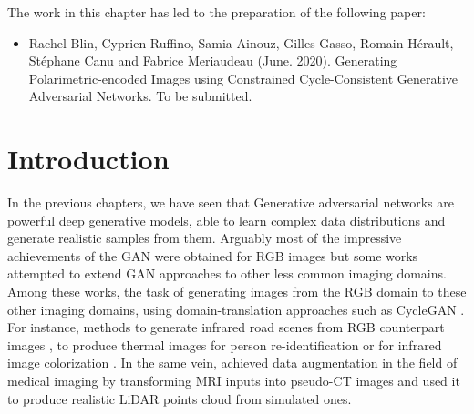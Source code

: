 The work in this chapter has led to the preparation of the following paper: 
\begin{itemize}
	\item Rachel Blin, Cyprien Ruffino, Samia Ainouz,  Gilles Gasso, Romain H\'erault, St\'ephane Canu and Fabrice Meriaudeau (June. 2020). Generating Polarimetric-encoded Images using Constrained Cycle-Consistent Generative Adversarial Networks.
	To be submitted.
\end{itemize}

\setcounter{minitocdepth}{3}
\minitoc
\setcounter{minitocdepth}{2}

\section{Introduction}


In the previous chapters, we have seen that Generative  adversarial networks \citep{Goodfellow2014} are powerful deep generative models, able to learn complex data distributions and generate realistic samples from them. Arguably most of the impressive achievements of the \ac{GAN} were obtained for \ac{RGB} images but some works attempted to extend \ac{GAN} approaches to other less common imaging domains. Among these works, the task of generating images from the \ac{RGB} domain to these other imaging domains, using domain-translation approaches such as \ac{CycleGAN} \citep{Zhu2017a}. For instance, methods to generate infrared road scenes from \ac{RGB} counterpart images \citep{Zhang2018b}, to produce thermal images for person re-identification \citep{Kniaz2018} or for infrared image colorization \citep{Mehri2019}. In the same vein, \citet{Nie2017} achieved data augmentation in the field of medical imaging by transforming MRI inputs into pseudo-CT images and \citet{Sallab2019} used it to produce realistic \ac{LiDAR} points cloud from simulated ones. 

